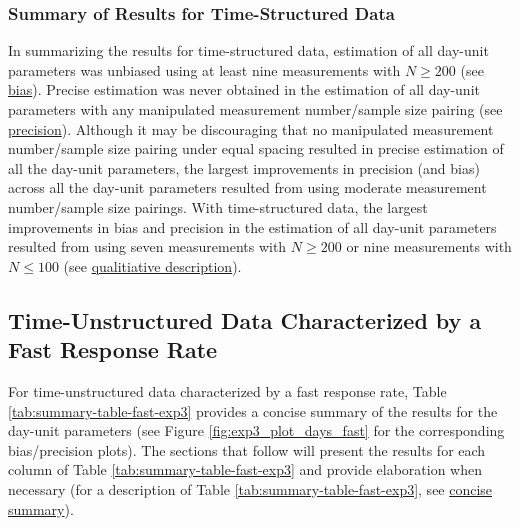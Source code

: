 \documentclass[
12pt, %
twoside,
english]{guelphthesis}
\begin{document}
\hypertarget{summary-of-results-for-time-structured-data}{%
\subsubsection{Summary of Results for Time-Structured Data}\label{summary-of-results-for-time-structured-data}}

In summarizing the results for time-structured data, estimation of all day-unit parameters was unbiased using at least nine measurements with \(N \ge 200\) (see \protect\hyperlink{bias-time-struc-exp3}{bias}). Precise estimation was never obtained in the estimation of all day-unit parameters with any manipulated measurement number/sample size pairing (see \protect\hyperlink{precision-time-struc-exp3}{precision}). Although it may be discouraging that no manipulated measurement number/sample size pairing under equal spacing resulted in precise estimation of all the day-unit parameters, the largest improvements in precision (and bias) across all the day-unit parameters resulted from using moderate measurement number/sample size pairings. With time-structured data, the largest improvements in bias and precision in the estimation of all day-unit parameters resulted from using seven measurements with \(N \ge 200\) or nine measurements with \(N \le 100\) (see \protect\hyperlink{qualitative-time-struc-exp3}{qualitiative description}).

\hypertarget{time-unstructured-data-characterized-by-a-fast-response-rate}{%
\subsection{Time-Unstructured Data Characterized by a Fast Response Rate}\label{time-unstructured-data-characterized-by-a-fast-response-rate}}

For time-unstructured data characterized by a fast response rate, Table \ref{tab:summary-table-fast-exp3} provides a concise summary of the results for the day-unit parameters (see Figure \ref{fig:exp3_plot_days_fast} for the corresponding bias/precision plots). The sections that follow will present the results for each column of Table \ref{tab:summary-table-fast-exp3} and provide elaboration when necessary (for a description of Table \ref{tab:summary-table-fast-exp3}, see \protect\hyperlink{concise-example-exp3}{concise summary}).
\end{document}
